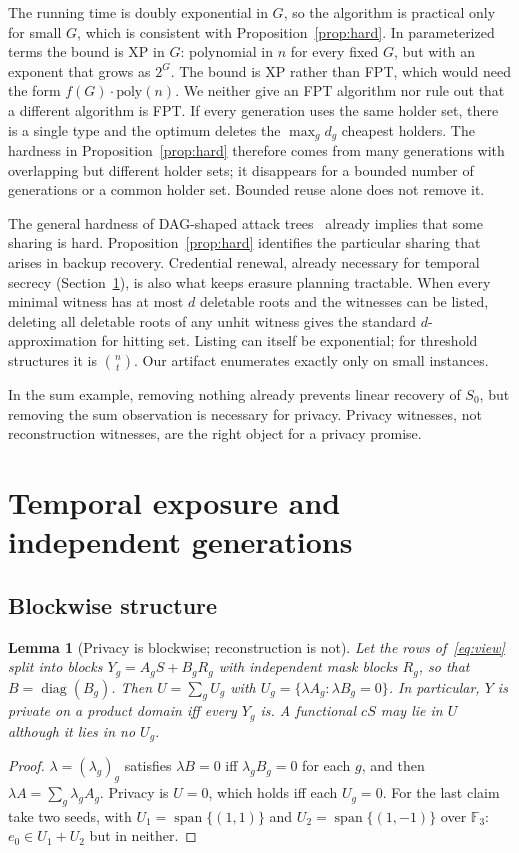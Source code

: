 \documentclass[pdflatex,sn-mathphys-num]{sn-jnl}%
\theoremstyle{plain}
\newtheorem{lemma}[theorem]{Lemma}
\theoremstyle{definition}
\newcommand{\F}{\mathbb{F}}
\begin{document}
The running time is doubly exponential in $G$, so the algorithm is practical only for small $G$, which is consistent with Proposition~\ref{prop:hard}. In parameterized terms the bound is XP in $G$: polynomial in $n$ for every fixed $G$, but with an exponent that grows as $2^G$. The bound is XP rather than FPT, which would need the form $f(G)\cdot\mathrm{poly}(n)$. We neither give an FPT algorithm nor rule out that a different algorithm is FPT. If every generation uses the same holder set, there is a single type and the optimum deletes the $\max_gd_g$ cheapest holders. The hardness in Proposition~\ref{prop:hard} therefore comes from many generations with overlapping but different holder sets; it disappears for a bounded number of generations or a common holder set. Bounded reuse alone does not remove it.

The general hardness of DAG-shaped attack trees~\cite{lopuhaa2022} already implies that some sharing is hard. Proposition~\ref{prop:hard} identifies the particular sharing that arises in backup recovery. Credential renewal, already necessary for temporal secrecy (Section~\ref{sec:temporal}), is also what keeps erasure planning tractable. When every minimal witness has at most $d$ deletable roots and the witnesses can be listed, deleting all deletable roots of any unhit witness gives the standard $d$-approximation for hitting set. Listing can itself be exponential; for threshold structures it is $\binom{n}{t}$. Our artifact enumerates exactly only on small instances.

In the sum example, removing nothing already prevents linear recovery of $S_0$, but removing the sum observation is necessary for privacy. Privacy witnesses, not reconstruction witnesses, are the right object for a privacy promise.


\section{Temporal exposure and independent generations}\label{sec:temporal}

\subsection{Blockwise structure}
\begin{lemma}[Privacy is blockwise; reconstruction is not]\label{lem:block}
Let the rows of~\eqref{eq:view} split into blocks $Y_g=A_gS+B_gR_g$ with independent mask blocks $R_g$, so that $B=\operatorname{diag}(B_g)$. Then $U=\sum_gU_g$ with $U_g=\{\lambda A_g:\lambda B_g=0\}$. In particular, $Y$ is private on a product domain iff every $Y_g$ is. A functional $cS$ may lie in $U$ although it lies in no $U_g$.
\end{lemma}
\begin{proof}
$\lambda=(\lambda_g)_g$ satisfies $\lambda B=0$ iff $\lambda_gB_g=0$ for each $g$, and then $\lambda A=\sum_g\lambda_gA_g$. Privacy is $U=0$, which holds iff each $U_g=0$. For the last claim take two seeds, with $U_1=\operatorname{span}\{(1,1)\}$ and $U_2=\operatorname{span}\{(1,-1)\}$ over $\F_3$: $e_0\in U_1+U_2$ but in neither.
\end{proof}
\end{document}

